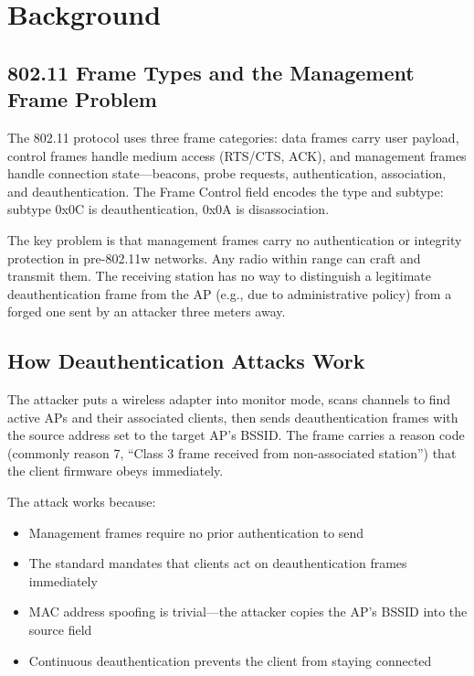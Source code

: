 \documentclass[conference]{IEEEtran}
\begin{document}
\section{Background}
\label{sec:background}

\subsection{802.11 Frame Types and the Management Frame Problem}

The 802.11 protocol uses three frame categories: data frames carry user payload, control frames handle medium access (RTS/CTS, ACK), and management frames handle connection state---beacons, probe requests, authentication, association, and deauthentication. The Frame Control field encodes the type and subtype: subtype 0x0C is deauthentication, 0x0A is disassociation.

The key problem is that management frames carry no authentication or integrity protection in pre-802.11w networks. Any radio within range can craft and transmit them. The receiving station has no way to distinguish a legitimate deauthentication frame from the AP (e.g., due to administrative policy) from a forged one sent by an attacker three meters away.

\subsection{How Deauthentication Attacks Work}

The attacker puts a wireless adapter into monitor mode, scans channels to find active APs and their associated clients, then sends deauthentication frames with the source address set to the target AP's BSSID. The frame carries a reason code (commonly reason 7, ``Class 3 frame received from non-associated station'') that the client firmware obeys immediately.

The attack works because:
\begin{itemize}
    \item Management frames require no prior authentication to send
    \item The standard mandates that clients act on deauthentication frames immediately
    \item MAC address spoofing is trivial---the attacker copies the AP's BSSID into the source field
    \item Continuous deauthentication prevents the client from staying connected
\end{itemize}
\end{document}
